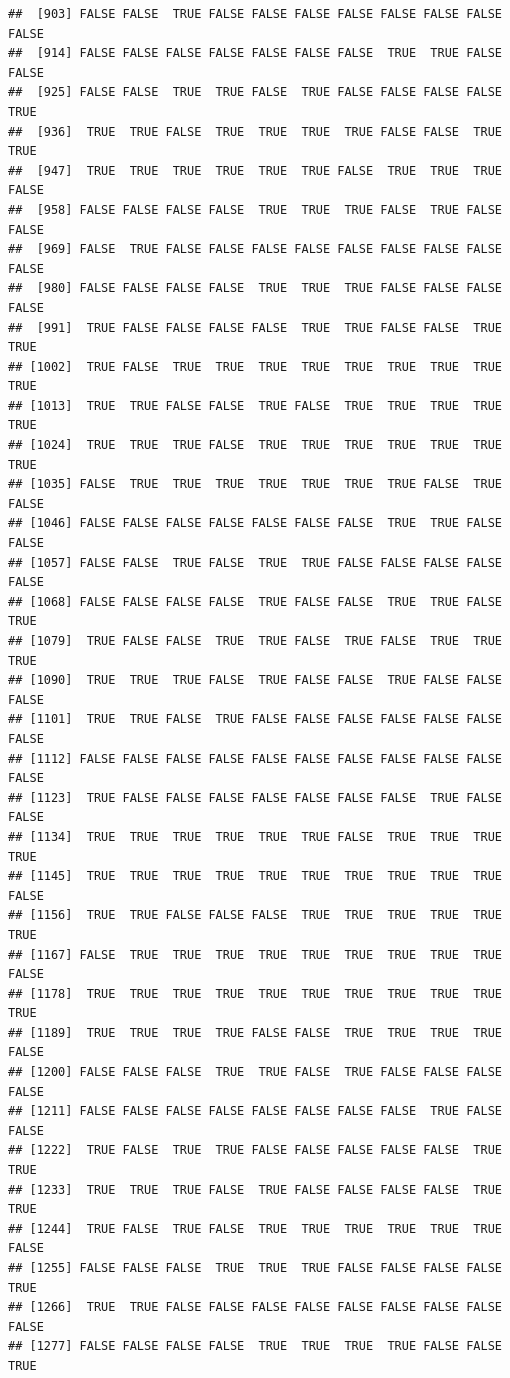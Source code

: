 \documentclass{article}\usepackage[]{graphicx}\usepackage[]{color}
\makeatletter
\newenvironment{kframe}{%
 \def\at@end@of@kframe{}%
 \ifinner\ifhmode%
  \def\at@end@of@kframe{\end{minipage}}%
  \begin{minipage}{\columnwidth}%
 \fi\fi%
 \def\FrameCommand##1{\hskip\@totalleftmargin \hskip-\fboxsep
 \colorbox{shadecolor}{##1}\hskip-\fboxsep
     \hskip-\linewidth \hskip-\@totalleftmargin \hskip\columnwidth}%
 \MakeFramed {\advance\hsize-\width
   \@totalleftmargin\z@ \linewidth\hsize
   \@setminipage}}%
 {\par\unskip\endMakeFramed%
 \at@end@of@kframe}
\newenvironment{knitrout}{}{} %
\makeatother
\begin{document}
\begin{knitrout}
\begin{kframe}
\begin{verbatim}
##  [903] FALSE FALSE  TRUE FALSE FALSE FALSE FALSE FALSE FALSE FALSE FALSE
##  [914] FALSE FALSE FALSE FALSE FALSE FALSE FALSE  TRUE  TRUE FALSE FALSE
##  [925] FALSE FALSE  TRUE  TRUE FALSE  TRUE FALSE FALSE FALSE FALSE  TRUE
##  [936]  TRUE  TRUE FALSE  TRUE  TRUE  TRUE  TRUE FALSE FALSE  TRUE  TRUE
##  [947]  TRUE  TRUE  TRUE  TRUE  TRUE  TRUE FALSE  TRUE  TRUE  TRUE FALSE
##  [958] FALSE FALSE FALSE FALSE  TRUE  TRUE  TRUE FALSE  TRUE FALSE FALSE
##  [969] FALSE  TRUE FALSE FALSE FALSE FALSE FALSE FALSE FALSE FALSE FALSE
##  [980] FALSE FALSE FALSE FALSE  TRUE  TRUE  TRUE FALSE FALSE FALSE FALSE
##  [991]  TRUE FALSE FALSE FALSE FALSE  TRUE  TRUE FALSE FALSE  TRUE  TRUE
## [1002]  TRUE FALSE  TRUE  TRUE  TRUE  TRUE  TRUE  TRUE  TRUE  TRUE  TRUE
## [1013]  TRUE  TRUE FALSE FALSE  TRUE FALSE  TRUE  TRUE  TRUE  TRUE  TRUE
## [1024]  TRUE  TRUE  TRUE FALSE  TRUE  TRUE  TRUE  TRUE  TRUE  TRUE  TRUE
## [1035] FALSE  TRUE  TRUE  TRUE  TRUE  TRUE  TRUE  TRUE FALSE  TRUE FALSE
## [1046] FALSE FALSE FALSE FALSE FALSE FALSE FALSE  TRUE  TRUE FALSE FALSE
## [1057] FALSE FALSE  TRUE FALSE  TRUE  TRUE FALSE FALSE FALSE FALSE FALSE
## [1068] FALSE FALSE FALSE FALSE  TRUE FALSE FALSE  TRUE  TRUE FALSE  TRUE
## [1079]  TRUE FALSE FALSE  TRUE  TRUE FALSE  TRUE FALSE  TRUE  TRUE  TRUE
## [1090]  TRUE  TRUE  TRUE FALSE  TRUE FALSE FALSE  TRUE FALSE FALSE FALSE
## [1101]  TRUE  TRUE FALSE  TRUE FALSE FALSE FALSE FALSE FALSE FALSE FALSE
## [1112] FALSE FALSE FALSE FALSE FALSE FALSE FALSE FALSE FALSE FALSE FALSE
## [1123]  TRUE FALSE FALSE FALSE FALSE FALSE FALSE FALSE  TRUE FALSE FALSE
## [1134]  TRUE  TRUE  TRUE  TRUE  TRUE  TRUE FALSE  TRUE  TRUE  TRUE  TRUE
## [1145]  TRUE  TRUE  TRUE  TRUE  TRUE  TRUE  TRUE  TRUE  TRUE  TRUE FALSE
## [1156]  TRUE  TRUE FALSE FALSE FALSE  TRUE  TRUE  TRUE  TRUE  TRUE  TRUE
## [1167] FALSE  TRUE  TRUE  TRUE  TRUE  TRUE  TRUE  TRUE  TRUE  TRUE FALSE
## [1178]  TRUE  TRUE  TRUE  TRUE  TRUE  TRUE  TRUE  TRUE  TRUE  TRUE  TRUE
## [1189]  TRUE  TRUE  TRUE  TRUE FALSE FALSE  TRUE  TRUE  TRUE  TRUE FALSE
## [1200] FALSE FALSE FALSE  TRUE  TRUE FALSE  TRUE FALSE FALSE FALSE FALSE
## [1211] FALSE FALSE FALSE FALSE FALSE FALSE FALSE FALSE  TRUE FALSE FALSE
## [1222]  TRUE FALSE  TRUE  TRUE FALSE FALSE FALSE FALSE FALSE  TRUE  TRUE
## [1233]  TRUE  TRUE  TRUE FALSE  TRUE FALSE FALSE FALSE FALSE  TRUE  TRUE
## [1244]  TRUE FALSE  TRUE FALSE  TRUE  TRUE  TRUE  TRUE  TRUE  TRUE FALSE
## [1255] FALSE FALSE FALSE  TRUE  TRUE  TRUE FALSE FALSE FALSE FALSE  TRUE
## [1266]  TRUE  TRUE FALSE FALSE FALSE FALSE FALSE FALSE FALSE FALSE FALSE
## [1277] FALSE FALSE FALSE FALSE  TRUE  TRUE  TRUE  TRUE FALSE FALSE  TRUE

\end{verbatim}
\end{kframe}
\end{knitrout}
\end{document}
